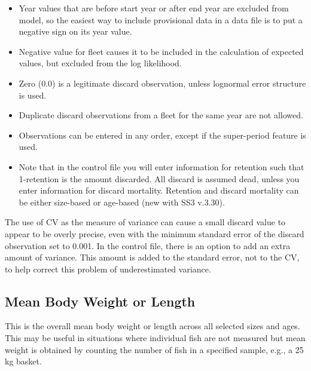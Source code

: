 \begin{itemize}
	\item Year values that are before start year or after end year are excluded from model, so the easiest way to include provisional data in a data file is to put a negative sign on its year value.
	\item Negative value for fleet causes it to be included in the calculation of expected values, but excluded from the log likelihood.
	\item Zero (0.0) is a legitimate discard observation, unless lognormal error structure is used.
	\item Duplicate discard observations from a fleet for the same year are not allowed.
	\item Observations can be entered in any order, except if the super-period feature is used. 
	\item Note that in the control file you will enter information for retention such that 1-retention is the amount discarded.  All discard is assumed dead, unless you enter information for discard mortality.  Retention and discard mortality can be either size-based or age-based (new with SS3 v.3.30).
\end{itemize}
	
The use of CV as the measure of variance can cause a small discard value to appear to be overly precise, even with the minimum standard error of the discard observation set to 0.001.  In the control file, there is an option to add an extra amount of variance.  This amount is added to the standard error, not to the CV, to help correct this problem of underestimated variance.


\subsection{Mean Body Weight or Length}
This is the overall mean body weight or length across all selected sizes and ages.  This may be useful in situations where individual fish are not measured but mean weight is obtained by counting the number of fish in a specified sample, e.g., a 25 kg basket.  

